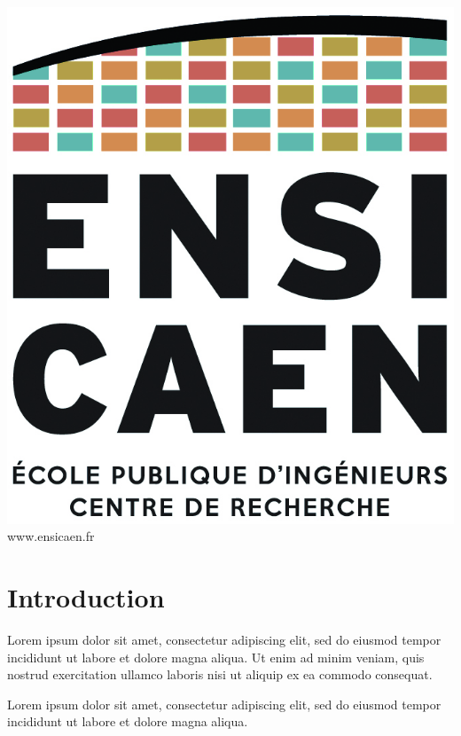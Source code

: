 \documentclass[a4paper]{report}
\begin{document}
\begin{titlepage}
    \begin{center}
        \begin{minipage}[c]{0.33\linewidth}
          \center\includegraphics[width=0.8\linewidth]{dep/LogoEnsicaen2017_crop.png}\\[1em]
          {\color{ensigray}\huge www.ensicaen.fr}
        \end{minipage}
    \end{center}
\end{titlepage}
\restoregeometry

\setlength{\footskip}{2cm}




\section*{Introduction}

Lorem ipsum dolor sit amet, consectetur adipiscing elit, sed do eiusmod tempor
incididunt ut labore et dolore magna aliqua. Ut enim ad minim veniam, quis
nostrud exercitation ullamco laboris nisi ut aliquip ex ea commodo consequat.

Lorem ipsum dolor sit amet, consectetur adipiscing elit, sed do eiusmod tempor
incididunt ut labore et dolore magna aliqua.
\end{document}
